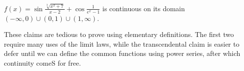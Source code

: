 
\begin{example}{}{}
$f(x)=\sin\frac{\sqrt[3]{x^2+7}}{x-2}+\cos\frac 1{e^x-1}$ is continuous on its domain $(-\infty,0)\cup(0,1)\cup(1,\infty)$.
\end{example}




These claims are tedious to prove using elementary definitions. The first two require many uses of the limit laws, while the transcendental claim is easier to defer until we can define the common functions using power series, after which continuity comeS for free.




\vfil\goodbreak

